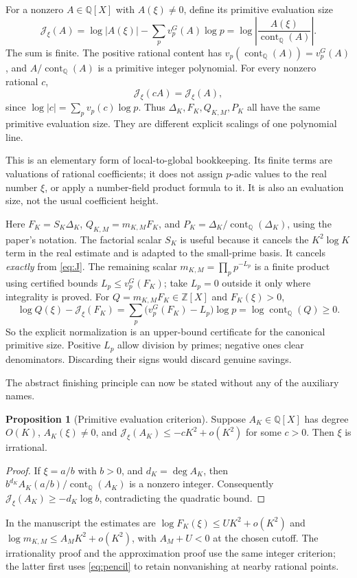\documentclass[11pt]{article}
\theoremstyle{definition}
\newtheorem{proposition}{Proposition}[section]
\theoremstyle{remark}\newtheorem*{remark}{Remark}
\newcommand{\Q}{\mathbb Q}
\newcommand{\Z}{\mathbb Z}
\newcommand{\cont}{\operatorname{cont}_{\Q}}
\begin{document}
For a nonzero $A\in\Q[X]$ with $A(\xi)\ne0$, define its primitive evaluation size
\begin{equation}\label{eq:J}
 \mathcal J_\xi(A)=\log|A(\xi)|-
                  \sum_p v_p^G(A)\log p
 =\log\left|\frac{A(\xi)}{\cont(A)}\right|.
\end{equation}
The sum is finite. The positive rational content has
$v_p(\cont(A))=v_p^G(A)$, and $A/\cont(A)$ is a primitive integer polynomial.
For every nonzero rational $c$,
\begin{equation}\label{eq:invariant}
 \mathcal J_\xi(cA)=\mathcal J_\xi(A),
\end{equation}
since $\log|c|=\sum_pv_p(c)\log p$. Thus $\Delta_K,F_K,Q_{K,M},P_K$
all have the same primitive evaluation size. They are different explicit
scalings of one polynomial line.

This is an elementary form of local-to-global bookkeeping. Its finite terms
are valuations of rational coefficients; it does not assign $p$-adic values
to the real number $\xi$, or apply a number-field product formula to it.
It is also an evaluation size, not the usual coefficient height.

Here $F_K=S_K\Delta_K$, $Q_{K,M}=m_{K,M}F_K$, and
$P_K=\Delta_K/\cont(\Delta_K)$, using the paper's notation.
The factorial scalar $S_K$ is useful because it cancels the $K^2\log K$ term
in the real estimate and is adapted to the small-prime basis. It cancels
\emph{exactly} from \eqref{eq:J}. The remaining scalar
$m_{K,M}=\prod_p p^{-L_p}$ is a finite product using certified bounds
$L_p\le v_p^G(F_K)$; take $L_p=0$ outside it only where integrality is proved.
For $Q=m_{K,M}F_K\in\Z[X]$ and $F_K(\xi)>0$,
\begin{equation}\label{eq:certified}
 \log Q(\xi)-\mathcal J_\xi(F_K)
 =\sum_p\bigl(v_p^G(F_K)-L_p\bigr)\log p
 =\log\cont(Q)\ge0.
\end{equation}
So the explicit normalization is an upper-bound certificate for the canonical
primitive size. Positive $L_p$ allow division by primes; negative ones clear
denominators. Discarding their signs would discard genuine savings.

The abstract finishing principle can now be stated without any of the
auxiliary names.
\begin{proposition}[Primitive evaluation criterion]\label{prop:criterion}
Suppose $A_K\in\Q[X]$ has degree $O(K)$, $A_K(\xi)\ne0$, and
$\mathcal J_\xi(A_K)\le-cK^2+o(K^2)$ for some $c>0$.
Then $\xi$ is irrational.
\end{proposition}
\begin{proof}
If $\xi=a/b$ with $b>0$, and $d_K=\deg A_K$, then
$b^{d_K}A_K(a/b)/\cont(A_K)$ is a nonzero integer. Consequently
$\mathcal J_\xi(A_K)\ge-d_K\log b$, contradicting the quadratic bound.
\end{proof}
In the manuscript the estimates are
$\log F_K(\xi)\le UK^2+o(K^2)$ and
$\log m_{K,M}\le A_MK^2+o(K^2)$, with $A_M+U<0$ at the chosen cutoff.
The irrationality proof and the approximation proof use the same integer
criterion; the latter first uses \eqref{eq:pencil} to retain nonvanishing at
nearby rational points.
\end{document}
